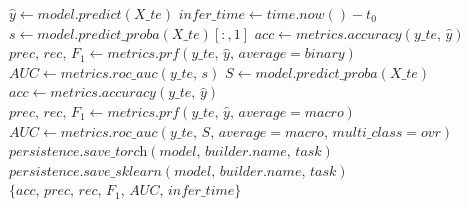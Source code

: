 \begin{algorithm}
\begin{algorithmic}
    \STATE $\hat{y} \gets \textit{model.predict}(\textit{X\_te})$
    \STATE $\textit{infer\_time} \gets \textit{time.now}() - \textit{t}_0$
      \STATE {}
      \STATE $s \gets \textit{model.predict\_proba}(\textit{X\_te})[:, 1]$
      \STATE $\textit{acc} \gets \textit{metrics.accuracy}(\textit{y\_te},\, \hat{y})$
      \STATE $\textit{prec},\, \textit{rec},\, F_1 \gets \textit{metrics.prf}(\textit{y\_te},\, \hat{y},\, \textit{average}=\textit{binary})$
      \STATE $\textit{AUC} \gets \textit{metrics.roc\_auc}(\textit{y\_te},\, s)$
    \ELSE
      \STATE {}
      \STATE $S \gets \textit{model.predict\_proba}(\textit{X\_te})$
      \STATE $\textit{acc} \gets \textit{metrics.accuracy}(\textit{y\_te},\, \hat{y})$
      \STATE $\textit{prec},\, \textit{rec},\, F_1 \gets \textit{metrics.prf}(\textit{y\_te},\, \hat{y},\, \textit{average}=\textit{macro})$
      \STATE $\textit{AUC} \gets \textit{metrics.roc\_auc}(\textit{y\_te},\, S,\, \textit{average}=\textit{macro},\, \textit{multi\_class}=\textit{ovr})$
    \ENDIF
    \STATE {}
      \STATE $\textit{persistence.save\_torch}(\textit{model},\, \textit{builder.name},\, \textit{task})$
    \ELSE
      \STATE $\textit{persistence.save\_sklearn}(\textit{model},\, \textit{builder.name},\, \textit{task})$
    \ENDIF
    \RETURN $\{\textit{acc},\, \textit{prec},\, \textit{rec},\, F_1,\, \textit{AUC},\, \textit{infer\_time}\}$
  \end{algorithmic}
\end{algorithm}
